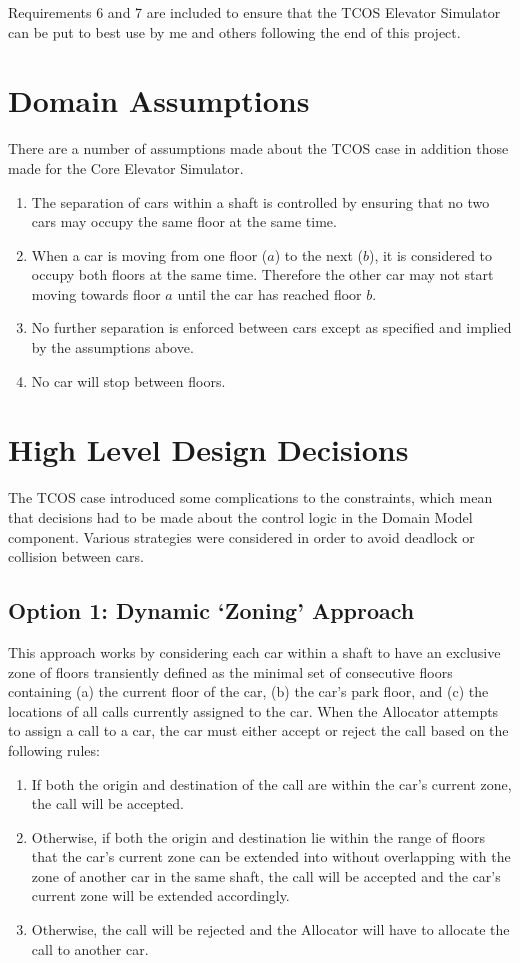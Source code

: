 \documentclass{UoYCSproject}
\begin{document}
Requirements 6 and 7 are included to ensure that the TCOS Elevator Simulator can be put to best use by me and others following the end of this project.

\section{Domain Assumptions}

There are a number of assumptions made about the TCOS case in addition those made for the Core Elevator Simulator.
	\begin{enumerate}
		\item The separation of cars within a shaft is controlled by ensuring that no two cars may occupy the same floor at the same time.
		\item When a car is moving from one floor ($a$) to the next ($b$), it is considered to occupy both floors at the same time.  Therefore the other car may not start moving towards floor $a$ until the car has reached floor $b$.
		\item No further separation is enforced between cars except as specified and implied by the assumptions above.
		\item No car will stop between floors.
	\end{enumerate}

\section{High Level Design Decisions}

The TCOS case introduced some complications to the constraints, which mean that decisions had to be made about the control logic in the Domain Model component.  Various strategies were considered in order to avoid deadlock or collision between cars.

\subsection{Option 1: Dynamic `Zoning' Approach}

This approach works by considering each car within a shaft to have an exclusive zone of floors transiently defined as the minimal set of consecutive floors containing (a) the current floor of the car, (b) the car's park floor, and (c) the locations of all calls currently assigned to the car.  When the Allocator attempts to assign a call to a car, the car must either accept or reject the call based on the following rules:
	\begin{enumerate}
		\item If both the origin and destination of the call are within the car's current zone, the call will be accepted.
		\item Otherwise, if both the origin and destination lie within the range of floors that the car's current zone can be extended into without overlapping with the zone of another car in the same shaft, the call will be accepted and the car's current zone will be extended accordingly.
		\item Otherwise, the call will be rejected and the Allocator will have to allocate the call to another car.
	\end{enumerate}
\end{document}
